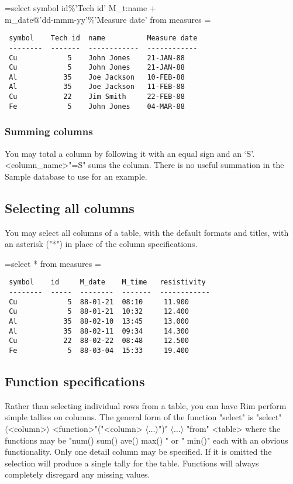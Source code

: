 \documentclass[11pt,a4paper]{report}
\def\opt#1{$\langle \mbox{#1} \rangle$}
\def\Rimdemo#1{\par\bigskip\toks0={#1}
  \setbox\Rimdemobox=\vbox\bgroup\hsize=24pc\scriptsize}
\def\enddemo{\egroup\noindent\fbox{\parbox{355pt}{%
  \vspace{1ex}
  {\tt\begin{tabular}{l}\the\toks0\end{tabular}\par}
  \vspace{1ex}
  \makebox[355pt]{\hfill\fbox{\fbox{\box\Rimdemobox}}\hskip1ex}\vspace{1ex}}}}
\def\I{\index}
\begin{document}
\Rimdemo{select symbol id\%'Tech id' M_t:name  +\\
  \qquad  m_date@'dd-mmm-yy'\%'Measure date' from measures}
\begin{verbatim}
 symbol    Tech id  name          Measure date
 --------  -------  ------------  ------------
 Cu            5    John Jones    21-JAN-88
 Cu            5    John Jones    21-JAN-88
 Al           35    Joe Jackson   10-FEB-88
 Al           35    Joe Jackson   11-FEB-88
 Cu           22    Jim Smith     22-FEB-88
 Fe            5    John Jones    04-MAR-88
\end{verbatim}
 
\subsubsection{Summing columns}
\I{sum}
You may total a column by following it with an equal sign and an `S'.
<column\_name>"=S"
sums the column.
There is no useful summation in the Sample database
to use for an example.
 
\subsection{Selecting all columns}
\I{*}
You may select all columns of a table, with the default formats
and titles, with an asterisk ("*") in place of the column specifications.
\Rimdemo{select * from measures}
\begin{verbatim}
 symbol    id     M_date    M_time   resistivity
 --------  -----  --------  -------  ------------
 Cu            5  88-01-21  08:10     11.900
 Cu            5  88-01-21  10:32     12.400
 Al           35  88-02-10  13:45     13.000
 Al           35  88-02-11  09:34     14.300
 Cu           22  88-02-22  08:48     12.500
 Fe            5  88-03-04  15:33     19.400
\end{verbatim}
 
\subsection{Function specifications}
\I{functions}
Rather than selecting individual rows from a table, you can
have Rim perform simple tallies on columns.
The general form of the function "select" is
"select" \opt{<column>} <function>"("<column> \opt{\ldots}")"
   \opt{\ldots} "from" <table>
where the functions may be
"num()  sum()  ave()  max()  " or " min()"
each with an obvious functionality.
Only one detail column may be specified.  If it is omitted
the selection will produce a single tally for the table.
Functions will always completely disregard any missing values.
 
\end{document}
